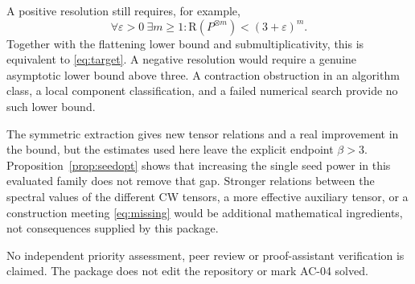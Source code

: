 \documentclass[11pt]{article}
\theoremstyle{definition}\newtheorem{definition}[theorem]{Definition}
\newcommand{\R}{\mathrm R}
\newcommand{\eps}{\varepsilon}
\begin{document}
A positive resolution still requires, for example,
\begin{equation}\label{eq:missing}
\forall\eps>0\ \exists m\ge1:
\R(P^{\otimes m})<(3+\eps)^m.
\end{equation}
Together with the flattening lower bound and submultiplicativity, this is equivalent to \eqref{eq:target}. A negative resolution would require a genuine asymptotic lower bound above three. A contraction obstruction in an algorithm class, a local component classification, and a failed numerical search provide no such lower bound.

The symmetric extraction gives new tensor relations and a real improvement in the bound, but the estimates used here leave the explicit endpoint $\beta>3$. Proposition~\ref{prop:seedopt} shows that increasing the single seed power in this evaluated family does not remove that gap. Stronger relations between the spectral values of the different CW tensors, a more effective auxiliary tensor, or a construction meeting \eqref{eq:missing} would be additional mathematical ingredients, not consequences supplied by this package.

No independent priority assessment, peer review or proof-assistant verification is claimed. The package does not edit the repository or mark AC-04 solved.
\end{document}
